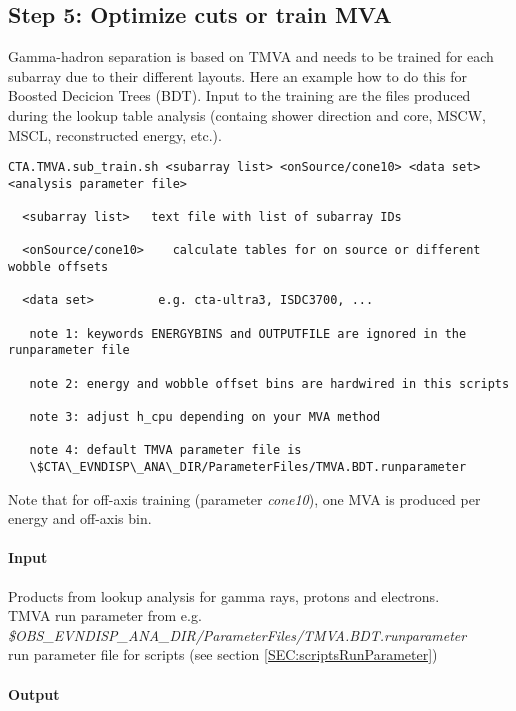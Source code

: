 \documentclass[titlepage,a4paper,twoside,11pt]{report}
\begin{document}
\subsection{Step 5: Optimize cuts or train MVA}

Gamma-hadron separation is based on TMVA and needs to be trained for
each subarray due to their different layouts. Here an example how to
do this for Boosted Decicion Trees (BDT).
Input to the training are the files produced during the lookup table analysis 
(containg shower direction and core, MSCW, MSCL, reconstructed energy, etc.).

\begin{lstlisting}
CTA.TMVA.sub_train.sh <subarray list> <onSource/cone10> <data set> <analysis parameter file>

  <subarray list>   text file with list of subarray IDs

  <onSource/cone10>    calculate tables for on source or different wobble offsets

  <data set>         e.g. cta-ultra3, ISDC3700, ...  

   note 1: keywords ENERGYBINS and OUTPUTFILE are ignored in the runparameter file

   note 2: energy and wobble offset bins are hardwired in this scripts

   note 3: adjust h_cpu depending on your MVA method

   note 4: default TMVA parameter file is 
   \$CTA\_EVNDISP\_ANA\_DIR/ParameterFiles/TMVA.BDT.runparameter
\end{lstlisting}

Note that for off-axis training (parameter {\it cone10}), one MVA is produced per energy and off-axis bin.

\paragraph{Input}
Products from lookup analysis for gamma rays, protons and electrons. \\
TMVA run parameter from e.g. \\
{\it \$OBS\_EVNDISP\_ANA\_DIR/ParameterFiles/TMVA.BDT.runparameter} \\
run parameter file for scripts (see section \ref{SEC:scriptsRunParameter})

\paragraph{Output}
\end{document}
